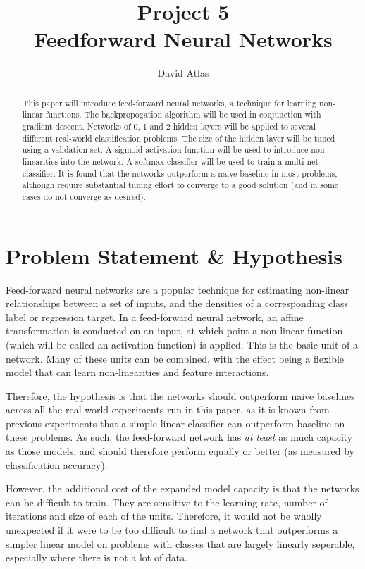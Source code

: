 \documentclass{amsart}
\title{Project 5 \\ Feedforward Neural Networks}
\author{David Atlas}
\begin{document}
    \begin{abstract}
    This paper will introduce feed-forward neural networks, a
        technique for learning non-linear functions. The backpropogation
        algorithm will be used in conjunction with
        gradient descent. Networks of 0, 1 and 2 hidden layers will be
        applied to several different real-world classification
        problems. The size of the hidden
        layer will be tuned using a validation set.
        A sigmoid activation function will
        be used to introduce non-linearities into the network.
        A softmax classifier will be used to train a multi-net
        classifier. It is found that the networks outperform
        a naive baseline in most problems, although require
        substantial tuning effort to converge to a good solution (and in some cases do not
    converge as desired).
    \end{abstract}
    \maketitle

    \section{Problem Statement \& Hypothesis}
    Feed-forward neural networks are a popular technique for estimating
    non-linear relationships between a set of inputs, and the densities of a
    corresponding class label or regression target. In a feed-forward
    neural network, an affine transformation is conducted on
    an input, at which point a non-linear function (which will be
    called an activation function) is applied. This is the basic
    unit of a network. Many of these units can be combined, with
    the effect being a flexible model that can learn non-linearities
    and feature interactions.

    Therefore, the hypothesis is that the networks should outperform
    naive baselines across all the real-world experiments run in
    this paper, as it is known from previous experiments that
    a simple linear classifier can outperform baseline on these
    problems. As such, the feed-forward network has \textit{at least}
    as much capacity as those models, and should therefore perform
    equally or better (as measured by classification accuracy).

    However, the additional cost of the expanded model
    capacity is that the networks can be difficult to train.
    They are sensitive to the learning rate, number of iterations
    and size of each of the units. Therefore, it would not be
    wholly unexpected if it were to be too difficult to find
    a network that outperforms a simpler linear model
    on problems with classes that are largely linearly seperable,
    especially where there is not a lot of data.
\end{document}
